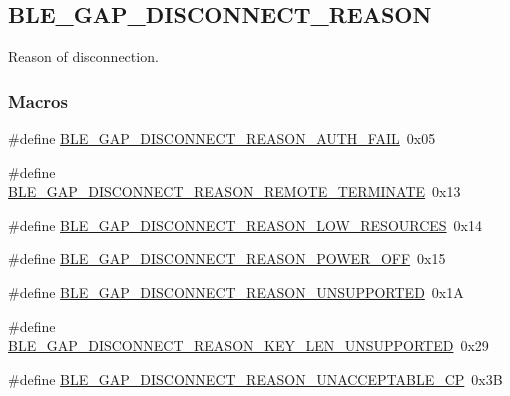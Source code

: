 \hypertarget{group___b_l_e___g_a_p___d_i_s_c_o_n_n_e_c_t___r_e_a_s_o_n}{}\subsection{B\+L\+E\+\_\+\+G\+A\+P\+\_\+\+D\+I\+S\+C\+O\+N\+N\+E\+C\+T\+\_\+\+R\+E\+A\+S\+ON}
\label{group___b_l_e___g_a_p___d_i_s_c_o_n_n_e_c_t___r_e_a_s_o_n}


Reason of disconnection.  


\subsubsection*{Macros}
\begin{DoxyCompactItemize}
\item 
\#define \hyperlink{group___b_l_e___g_a_p___d_i_s_c_o_n_n_e_c_t___r_e_a_s_o_n_gad573726e6e1a641dcef47f1ec612dd6d}{B\+L\+E\+\_\+\+G\+A\+P\+\_\+\+D\+I\+S\+C\+O\+N\+N\+E\+C\+T\+\_\+\+R\+E\+A\+S\+O\+N\+\_\+\+A\+U\+T\+H\+\_\+\+F\+A\+IL}~0x05
\item 
\#define \hyperlink{group___b_l_e___g_a_p___d_i_s_c_o_n_n_e_c_t___r_e_a_s_o_n_ga7dec032ac729d76a077a6d6f11350ab5}{B\+L\+E\+\_\+\+G\+A\+P\+\_\+\+D\+I\+S\+C\+O\+N\+N\+E\+C\+T\+\_\+\+R\+E\+A\+S\+O\+N\+\_\+\+R\+E\+M\+O\+T\+E\+\_\+\+T\+E\+R\+M\+I\+N\+A\+TE}~0x13
\item 
\#define \hyperlink{group___b_l_e___g_a_p___d_i_s_c_o_n_n_e_c_t___r_e_a_s_o_n_ga4e53a30f07ea804f90cf496d332cfb8c}{B\+L\+E\+\_\+\+G\+A\+P\+\_\+\+D\+I\+S\+C\+O\+N\+N\+E\+C\+T\+\_\+\+R\+E\+A\+S\+O\+N\+\_\+\+L\+O\+W\+\_\+\+R\+E\+S\+O\+U\+R\+C\+ES}~0x14
\item 
\#define \hyperlink{group___b_l_e___g_a_p___d_i_s_c_o_n_n_e_c_t___r_e_a_s_o_n_gaa393f67759042aca5422bf70f4857a6e}{B\+L\+E\+\_\+\+G\+A\+P\+\_\+\+D\+I\+S\+C\+O\+N\+N\+E\+C\+T\+\_\+\+R\+E\+A\+S\+O\+N\+\_\+\+P\+O\+W\+E\+R\+\_\+\+O\+FF}~0x15
\item 
\#define \hyperlink{group___b_l_e___g_a_p___d_i_s_c_o_n_n_e_c_t___r_e_a_s_o_n_gacc04c49655d6f896e2e8a4485b39fb66}{B\+L\+E\+\_\+\+G\+A\+P\+\_\+\+D\+I\+S\+C\+O\+N\+N\+E\+C\+T\+\_\+\+R\+E\+A\+S\+O\+N\+\_\+\+U\+N\+S\+U\+P\+P\+O\+R\+T\+ED}~0x1A
\item 
\#define \hyperlink{group___b_l_e___g_a_p___d_i_s_c_o_n_n_e_c_t___r_e_a_s_o_n_gae86caae93a8b5476edfbe51987623dac}{B\+L\+E\+\_\+\+G\+A\+P\+\_\+\+D\+I\+S\+C\+O\+N\+N\+E\+C\+T\+\_\+\+R\+E\+A\+S\+O\+N\+\_\+\+K\+E\+Y\+\_\+\+L\+E\+N\+\_\+\+U\+N\+S\+U\+P\+P\+O\+R\+T\+ED}~0x29
\item 
\#define \hyperlink{group___b_l_e___g_a_p___d_i_s_c_o_n_n_e_c_t___r_e_a_s_o_n_ga66abd41d71cc5b0395392b4ac81e467d}{B\+L\+E\+\_\+\+G\+A\+P\+\_\+\+D\+I\+S\+C\+O\+N\+N\+E\+C\+T\+\_\+\+R\+E\+A\+S\+O\+N\+\_\+\+U\+N\+A\+C\+C\+E\+P\+T\+A\+B\+L\+E\+\_\+\+CP}~0x3B
\end{DoxyCompactItemize}


